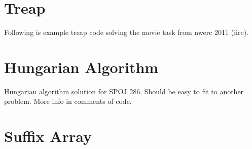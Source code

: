 \documentclass[a4paper,final,8pt]{article}
\begin{document}
\section{Treap}

Following is example treap code solving the movie task from nwerc 2011 (iirc).



\section{Hungarian Algorithm}

Hungarian algorithm solution for SPOJ 286. Should be easy to fit to another
problem. More info in comments of code.



\section{Suffix Array}
\end{document}
